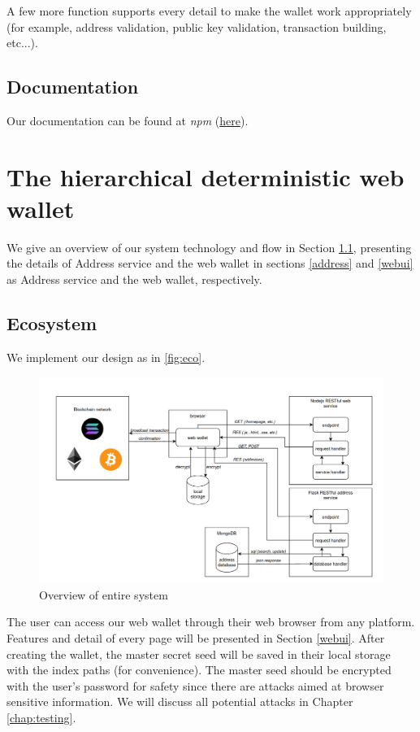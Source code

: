A few more function supports every detail to make the wallet work appropriately (for example, address validation, public key validation, transaction building, etc...).


\subsection{Documentation}
Our documentation can be found at \textit{npm} ({\href{https://www.npmjs.com/package/hdcore-ts}{here}}).


\section{The hierarchical deterministic web wallet}

We give an overview of our system technology and flow in Section \ref{echo}, presenting the details of Address service and the web wallet in sections \ref{address} and \ref{webui} as Address service and the web wallet, respectively.

\subsection{Ecosystem}
\label{echo}

We implement our design as in \autoref{fig:eco}.

\begin{figure}[ht!]
    \centering
    \includegraphics[width=1\textwidth]{images/ecosystem.png}
    \caption[Overview of entire system]{Overview of entire system}
    \label{fig:eco}
\end{figure}

The user can access our web wallet through their web browser from any platform. Features and detail of every page will be presented in Section \ref{webui}. After creating the wallet, the master secret seed will be saved in their local storage with the index paths  (for convenience). The master seed should be encrypted with the user’s password for safety since there are attacks aimed at browser sensitive information. We will discuss all potential attacks in Chapter \ref{chap:testing}.


